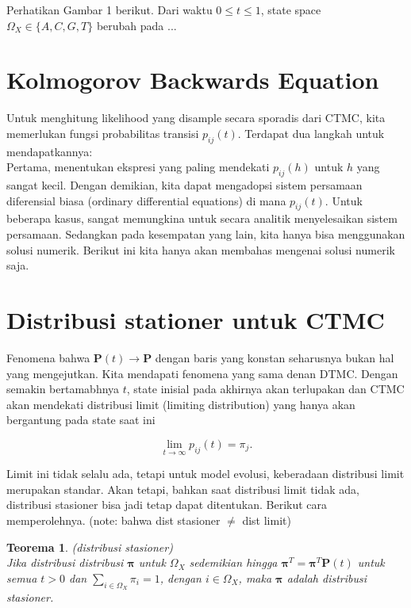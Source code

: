 \documentclass[11pt,b5paper,twoside]{book}
\newcommand{\bP}{\boldsymbol{P}}
\newtheorem{theorem}{Teorema}[section]
\begin{document}
	Perhatikan Gambar 1 berikut. Dari waktu $ 0 \leq t \leq 1$, state space $\Omega_X \in \{A, C, G, T\}$ berubah pada ...
	
	
	
	\section{Kolmogorov Backwards Equation} %

	\noindent Untuk menghitung likelihood yang disample secara sporadis dari CTMC, kita memerlukan fungsi probabilitas transisi $p_{ij} (t)$. Terdapat dua langkah untuk mendapatkannya:\\
	
	Pertama, menentukan ekspresi yang paling mendekati $p_{ij} (h)$ untuk $h$ yang sangat kecil. Dengan demikian, kita dapat mengadopsi sistem persamaan diferensial biasa (ordinary differential equations) di mana $p_{ij} (t)$. Untuk beberapa kasus, sangat memungkina untuk secara analitik menyelesaikan sistem persamaan.  Sedangkan pada kesempatan yang lain, kita hanya bisa menggunakan solusi numerik. Berikut ini kita hanya akan membahas mengenai solusi numerik saja.
	
	
	\section{Distribusi stationer untuk CTMC} %
	
	\noindent Fenomena bahwa $\bP (t) \rightarrow \bP$ dengan baris yang konstan seharusnya bukan hal yang mengejutkan. Kita mendapati fenomena yang sama denan DTMC.  Dengan semakin bertamabhnya $t$, state inisial pada akhirnya akan terlupakan dan CTMC akan mendekati distribusi limit (limiting distribution) yang hanya akan bergantung pada state saat ini
	
	\[
		\lim\limits_{t \rightarrow \infty} p_{ij}(t) = \pi_j.
	\]
	
	Limit ini tidak selalu ada, tetapi untuk model evolusi, keberadaan distribusi limit merupakan standar. Akan tetapi, bahkan saat distribusi limit tidak ada, distribusi stasioner bisa jadi tetap dapat ditentukan. Berikut cara memperolehnya.  (note: bahwa dist stasioner $\neq $  dist limit)
	
	\begin{theorem} (distribusi stasioner)\\
		Jika distribusi distribusi $\boldsymbol{\pi}$ untuk \hspace{0.08cm} $ \Omega_X$ sedemikian hingga $\boldsymbol{\pi}^T =\boldsymbol{\pi}^T \bP(t)$ untuk semua $t > 0$ dan $\sum_{i \in \Omega_X} \pi_i = 1$, dengan $i \in \Omega_X$, maka $\boldsymbol{\pi}$ adalah distribusi stasioner.
	\end{theorem}
	
\end{document}
